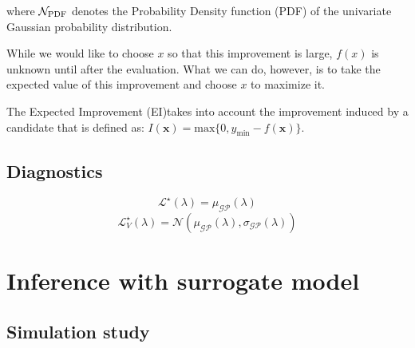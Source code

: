\documentclass[twocolumn]{aastex631}
\begin{document}
where $\mathcal{N}_{\rm PDF}$ denotes the Probability Density function (PDF) of the univariate Gaussian probability distribution.

While we would like to choose $x$ so that this improvement is large, $f(x)$ is unknown until after the evaluation.  What we can do, however, 
is to take the expected value of this improvement and choose $x$ to maximize it.

The Expected Improvement (EI)takes into account the improvement induced by a candidate that is defined as: $I(\textbf{x})=\text{max}\{0,y_{\text{min}}-f(\textbf{x})\}$. 












\subsection{Diagnostics}

\begin{equation}
    \mathcal{L}^{\star}(\lambda) = \mu_{\mathcal{GP}}(\lambda)
\end{equation}
\begin{equation}
    \mathcal{L}^{\star}_{V}(\lambda) = \mathcal{N}(\mu_{\mathcal{GP}}(\lambda), \sigma_{\mathcal{GP}}(\lambda))
\end{equation}



\section{Inference with surrogate model}

\subsection{Simulation study}
\end{document}
